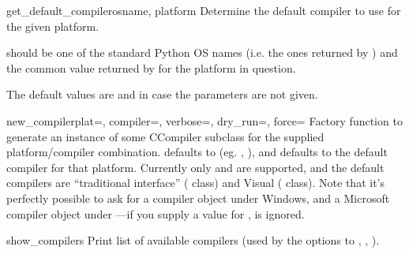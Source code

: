 \documentclass{manual}
\begin{document}
\begin{funcdesc}{get_default_compiler}{osname, platform}
Determine the default compiler to use for the given platform.
    
 should be one of the standard Python OS names (i.e. the
ones returned by ) and  the common value
returned by  for the platform in question.
    
The default values are  and  in case the
parameters are not given.
\end{funcdesc}

\begin{funcdesc}{new_compiler}{plat=, compiler=, verbose=, dry_run=, force=}
Factory function to generate an instance of some CCompiler subclass
for the supplied platform/compiler combination.  defaults
to  (eg. , ), and  
defaults to the default compiler for that platform. Currently only
 and  are supported, and the default
compilers are ``traditional \UNIX{} interface'' (
class) and Visual \Cpp ( class).  Note that it's
perfectly possible to ask for a \UNIX{} compiler object under Windows,
and a Microsoft compiler object under \UNIX---if you supply a value
for ,  is ignored.
\end{funcdesc}

\begin{funcdesc}{show_compilers}{}
Print list of available compilers (used by the
 options to ,
, ).
\end{funcdesc}
\end{document}

